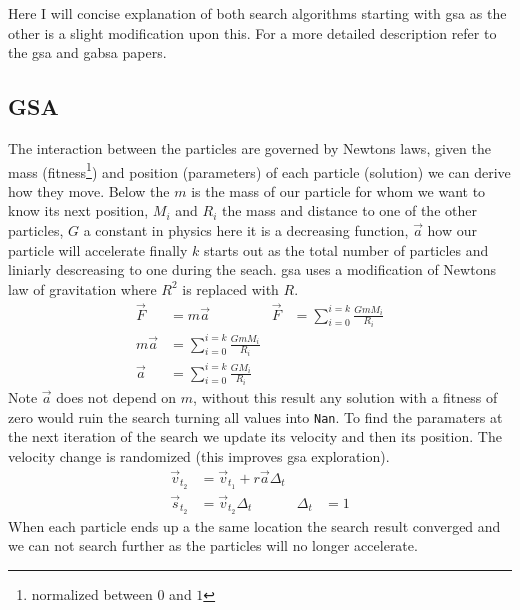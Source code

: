 Here I will concise explanation of both search algorithms starting with \ac{gsa} as the other is a slight modification upon this. For a more detailed description refer to the \ac{gsa}\cite{GSA} and \ac{gabsa}\cite{GABSA} papers.
%
\subsection{GSA} \label{sec:GSA}
The interaction between the particles are governed by Newtons laws, given the mass (fitness\footnote{normalized between $0$ and $1$}) and position (parameters) of each particle (solution) we can derive how they move. Below the $m$ is the mass of our particle for whom we want to know its next position, $M_i$ and $R_i$ the mass and distance to one of the other particles, $G$ a constant in physics here it is a decreasing function, $\vec{a}$ how our particle will accelerate finally $k$ starts out as the total number of particles and liniarly descreasing to one during the seach.
\ac{gsa} uses a modification of Newtons law of gravitation where $R^2$ is replaced with $R$.
%
\begin{subequations}
\begin{align}
	\vec{F}&=m\vec{a} &            \vec{F}&=\sum_{i=0}^{i=k} \frac{GmM_i}{R_i} \\
	m\vec{a} &= \sum_{i=0}^{i=k} \frac{GmM_i}{R_i} \\
	\vec{a} &= \sum_{i=0}^{i=k} \frac{GM_i}{R_i}
\end{align}
\end{subequations}
%
Note $\vec{a}$ does not depend on $m$, without this result any solution with a fitness of zero would ruin the search turning all values into \texttt{Nan}. To find the paramaters at the next iteration of the search we update its velocity and then its position. The velocity change is randomized (this improves \ac{gsa} exploration).
%
\begin{subequations}
\begin{align} \label{eq:paramater_update}
	\vec{v}_{t_2} &= \vec{v}_{t_1} + r \vec{a}\Delta_t \\
	\vec{s}_{t_2} &= \vec{v}_{t_2}\Delta_t & \Delta_t &= 1 \label{eq:pos_update}
\end{align}
\end{subequations}
%
When each particle ends up a the same location the search result converged and we can not search further as the particles will no longer accelerate.
%
